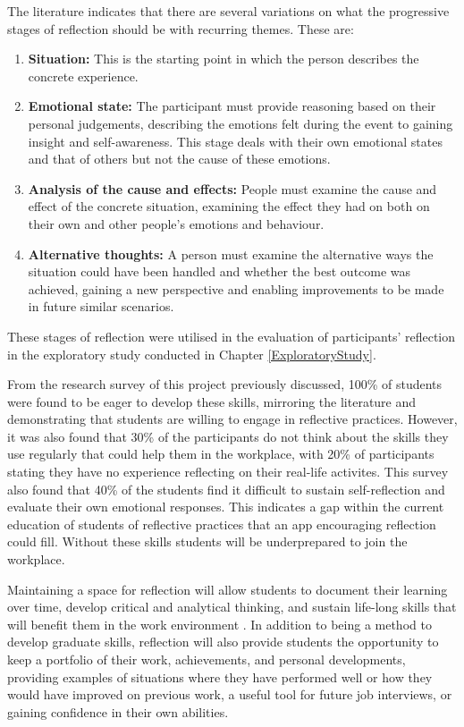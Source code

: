 \documentclass{l4proj}
\begin{document}
The literature indicates that there are several variations on what the progressive stages of reflection should be with recurring themes. These are:
\begin{enumerate}
    \item \textbf{Situation:} This is the starting point in which the person describes the concrete experience.
    \item \textbf{Emotional state:} The participant must provide reasoning based on their personal judgements, describing the emotions felt during the event to gaining insight and self-awareness. This stage deals with their own emotional states and that of others but not the cause of these emotions.
    \item \textbf{Analysis of the cause and effects:} People must examine the cause and effect of the concrete situation, examining the effect they had on both on their own and other people's emotions and behaviour.
    \item \textbf{Alternative thoughts:} A person must examine the alternative ways the situation could have been handled and whether the best outcome was achieved, gaining a new perspective and enabling improvements to be made in future similar scenarios.
\end{enumerate}
These stages of reflection were utilised in the evaluation of participants' reflection in the exploratory study conducted in Chapter \ref{ExploratoryStudy}.

From the research survey of this project previously discussed, 100\% of students were found to be eager to develop these skills, mirroring the literature and demonstrating that students are willing to engage in reflective practices. However, it was also found that 30\% of the participants do not think about the skills they use regularly that could help them in the workplace, with 20\% of participants stating they have no experience reflecting on their real-life activites. This survey also found that 40\% of the students find it difficult to sustain self-reflection and evaluate their own emotional responses. This indicates a gap within the current education of students of reflective practices that an app encouraging reflection could fill. Without these skills students will be underprepared to join the workplace.

Maintaining a space for reflection will allow students to document their learning over time, develop critical and analytical thinking, and sustain life-long skills that will benefit them in the work environment \citep{mcdermott_developing_nodate}.  In addition to being a method to develop graduate skills, reflection will also provide students the opportunity to keep a portfolio of their work, achievements, and personal developments, providing examples of situations where they have performed well or how they would have improved on previous work, a useful tool for future job interviews, or gaining confidence in their own abilities. 
\end{document}
